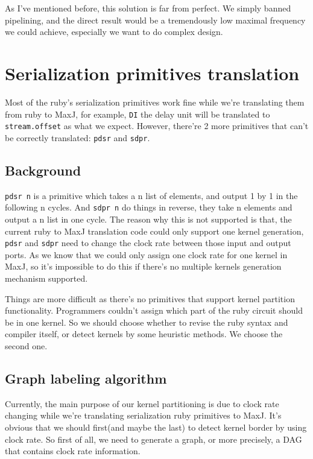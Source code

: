 \documentclass[a4paper, 10pt]{report}
\begin{document}
As I've mentioned before, this solution is far from perfect. We simply banned pipelining, and the direct result would be a tremendously low maximal frequency we could achieve, especially we want to do complex design.

\section{Serialization primitives translation}

Most of the ruby's serialization primitives work fine while we're translating them from ruby to MaxJ, for example, \texttt{DI} the delay unit will be translated to \texttt{stream.offset} as what we expect. However, there're 2 more primitives that can't be correctly translated: \texttt{pdsr} and \texttt{sdpr}.

\subsection{Background}

\texttt{pdsr n} is a primitive which takes a n list of elements, and output 1 by 1 in the following n cycles. And \texttt{sdpr n} do things in reverse, they take n elements and output a n list in one cycle. The reason why this is not supported is that, the current ruby to MaxJ translation code could only support one kernel generation, \texttt{pdsr} and \texttt{sdpr} need to change the clock rate between those input and output ports. As we know that we could only assign one clock rate for one kernel in MaxJ, so it's impossible to do this if there's no multiple kernels generation mechanism supported.

Things are more difficult as there's no primitives that support kernel partition functionality. Programmers couldn't assign which part of the ruby circuit should be in one kernel. So we should choose whether to revise the ruby syntax and compiler itself, or detect kernels by some heuristic methods. We choose the second one.

\subsection{Graph labeling algorithm}

Currently, the main purpose of our kernel partitioning is due to clock rate changing while we're translating serialization ruby primitives to MaxJ. It's obvious that we should first(and maybe the last) to detect kernel border by using clock rate. So first of all, we need to generate a graph, or more precisely, a DAG that contains clock rate information. 
\end{document}
